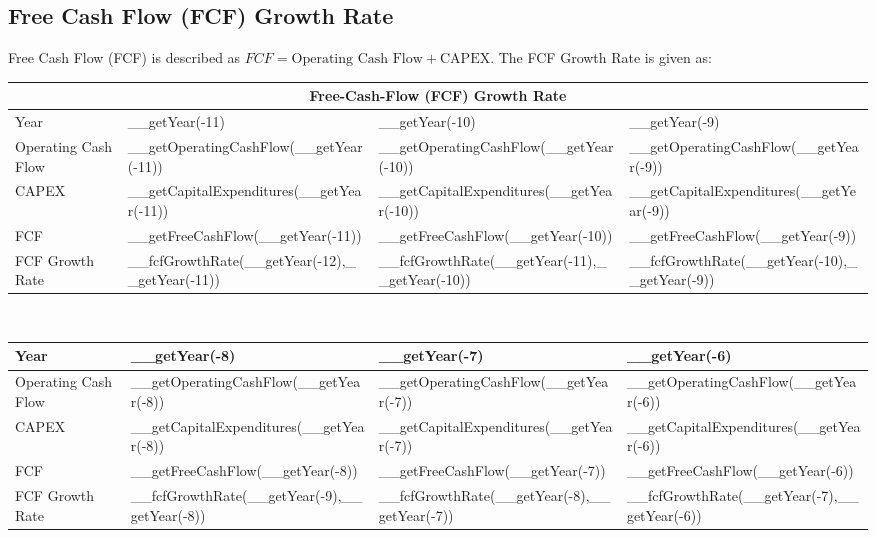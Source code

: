 \subsection{Free Cash Flow (FCF) Growth Rate}

Free Cash Flow (FCF) is described as $FCF = \text{Operating Cash Flow} + \text{CAPEX}$.
The FCF Growth Rate is given as:\\

\begin{tabularx}{\textwidth}{|X|X|X|X|}
 \hline
 \multicolumn{4}{|c|}{Free-Cash-Flow (FCF) Growth Rate} \\
 \hline
 Year                                 & __getYear(-11)                                 & __getYear(-10)                                 & __getYear(-9)                                 \\
 \hline
 Operating Cash Flow                  & __getOperatingCashFlow(__getYear(-11))         & __getOperatingCashFlow(__getYear(-10))         & __getOperatingCashFlow(__getYear(-9))         \\
 CAPEX                                & __getCapitalExpenditures(__getYear(-11))       & __getCapitalExpenditures(__getYear(-10))       & __getCapitalExpenditures(__getYear(-9))       \\
 FCF                                  & __getFreeCashFlow(__getYear(-11))              & __getFreeCashFlow(__getYear(-10))              & __getFreeCashFlow(__getYear(-9))              \\
 \rowcolor{lightgray} FCF Growth Rate & __fcfGrowthRate(__getYear(-12),__getYear(-11)) & __fcfGrowthRate(__getYear(-11),__getYear(-10)) & __fcfGrowthRate(__getYear(-10),__getYear(-9)) \\
 \hline
\end{tabularx}\\

\begin{tabularx}{\textwidth}{|X|X|X|X|}
 \hline
 Year                                 & __getYear(-8)                                 & __getYear(-7)                                 & __getYear(-6)                                 \\
 \hline
 Operating Cash Flow                  & __getOperatingCashFlow(__getYear(-8))         & __getOperatingCashFlow(__getYear(-7))         & __getOperatingCashFlow(__getYear(-6))         \\
 CAPEX                                & __getCapitalExpenditures(__getYear(-8))       & __getCapitalExpenditures(__getYear(-7))       & __getCapitalExpenditures(__getYear(-6))       \\
 FCF                                  & __getFreeCashFlow(__getYear(-8))              & __getFreeCashFlow(__getYear(-7))              & __getFreeCashFlow(__getYear(-6))              \\
 \rowcolor{lightgray} FCF Growth Rate & __fcfGrowthRate(__getYear(-9),__getYear(-8))  & __fcfGrowthRate(__getYear(-8),__getYear(-7))  & __fcfGrowthRate(__getYear(-7),__getYear(-6))  \\
 \hline
\end{tabularx}\\

